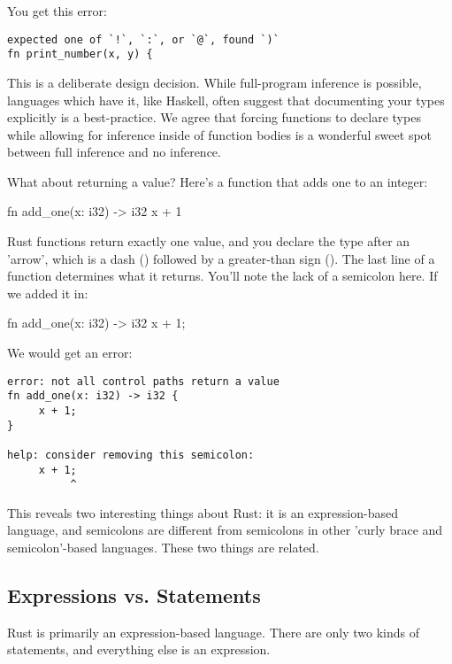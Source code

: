 You get this error:

\begin{verbatim}
expected one of `!`, `:`, or `@`, found `)`
fn print_number(x, y) {
\end{verbatim}

This is a deliberate design decision. While full-program inference is possible, languages which have it, like Haskell, often 
suggest that documenting your types explicitly is a best-practice. We agree that forcing functions to declare types while 
allowing for inference inside of function bodies is a wonderful sweet spot between full inference and no inference.

\blank

What about returning a value? Here's a function that adds one to an integer:

\begin{rustc}
fn add_one(x: i32) -> i32 {
    x + 1
}
\end{rustc}

Rust functions return exactly one value, and you declare the type after an 'arrow', which is a dash (\code{-}) followed by a 
greater-than sign (\code{>}). The last line of a function determines what it returns. You'll note the lack of a semicolon here. 
If we added it in:

\begin{rustc}
fn add_one(x: i32) -> i32 {
    x + 1;
}
\end{rustc}

We would get an error:

\begin{verbatim}
error: not all control paths return a value
fn add_one(x: i32) -> i32 {
     x + 1;
}

help: consider removing this semicolon:
     x + 1;
          ^
\end{verbatim}

This reveals two interesting things about Rust: it is an expression-based language, and semicolons are different from semicolons 
in other 'curly brace and semicolon'-based languages. These two things are related.

\subsection*{Expressions vs. Statements}

Rust is primarily an expression-based language. There are only two kinds of statements, and everything else is an expression.

